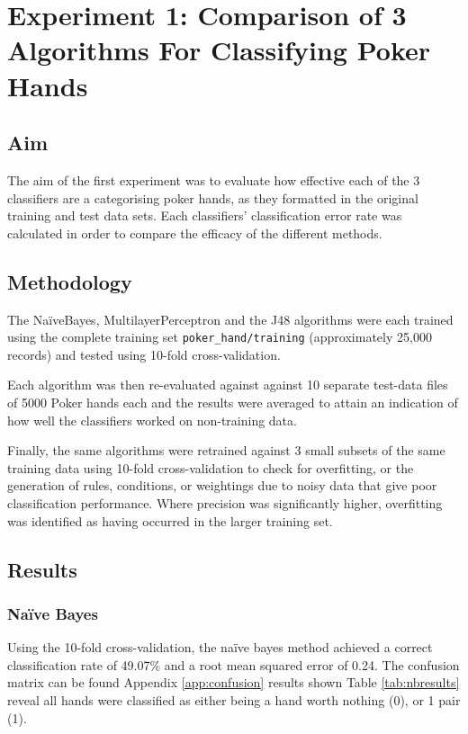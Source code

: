 \documentclass[10pt, a4paper]{article}
\begin{document}
\section*{Experiment 1: Comparison of 3 Algorithms For Classifying Poker Hands}

\subsection*{Aim}

The aim of the first experiment was to evaluate how effective each of the 3 classifiers are a categorising poker hands, as they formatted in the original training and test data sets. Each classifiers' classification error rate was calculated in order to compare the efficacy of the different methods.

\subsection*{Methodology}

The Na\"iveBayes, MultilayerPerceptron and the J48 algorithms were each trained using the complete training set \texttt{poker\_hand/training} (approximately 25,000 records) and tested using 10-fold cross-validation.

Each algorithm was then re-evaluated against against 10 separate test-data files of 5000 Poker hands each and the results were averaged to attain an indication of how well the classifiers worked on non-training data.

Finally, the same algorithms were retrained against 3 small subsets of the same training data using 10-fold cross-validation to check for overfitting, or the generation of rules, conditions, or weightings due to noisy data that give poor classification performance. Where precision was significantly higher, overfitting was identified as having occurred in the larger training set.

\subsection*{Results}

\subsubsection*{Na\"ive Bayes}

Using the 10-fold cross-validation, the na\"ive bayes method achieved a correct classification rate of 49.07\% and a root mean squared error of 0.24. The confusion matrix can be found Appendix \ref{app:confusion} results shown Table \ref{tab:nbresults} reveal all hands were classified as either being a hand worth nothing (0), or 1 pair (1). 
\end{document}
